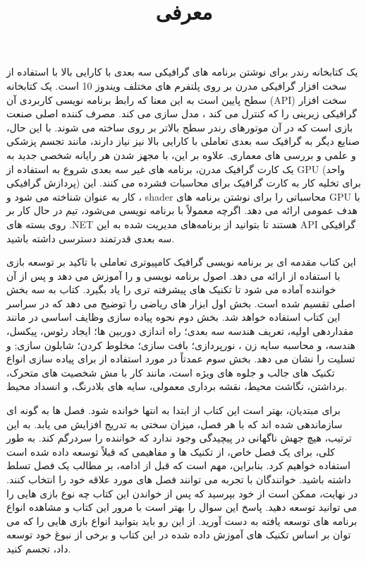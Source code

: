 \title{
    \center \Huge
    معرفی \\[25pt]
}

{
        {  \large
     یک کتابخانه رندر برای نوشتن برنامه های گرافیکی سه بعدی با کارایی بالا با استفاده از سخت افزار گرافیکی مدرن بر روی پلتفرم های مختلف ویندوز 10  است.
     یک کتابخانه سطح پایین است به این معنا که رابط برنامه نویسی کاربردی آن (API) سخت افزار گرافیکی زیرینی را که کنترل می کند ، مدل سازی می کند.
    مصرف کننده اصلی  صنعت بازی است که در آن موتورهای رندر سطح بالاتر بر روی  ساخته می شوند.
    با این حال، صنایع دیگر به گرافیک سه بعدی تعاملی با کارایی بالا نیز نیاز دارند، مانند تجسم پزشکی و علمی و بررسی های معماری.
    علاوه بر این، با مجهز شدن هر رایانه شخصی جدید به یک کارت گرافیک مدرن، برنامه های غیر سه بعدی شروع به استفاده از GPU (واحد پردازش گرافیکی) برای تخلیه کار به کارت گرافیک برای محاسبات فشرده می کنند.
    این کار به عنوان  شناخته می شود و  ، shader محاسباتی را برای نوشتن برنامه های GPU با هدف عمومی ارائه می دهد.
    اگرچه  معمولاً با   برنامه نویسی می‌شود، تیم   در حال کار بر روی بسته های .NET هستند تا بتوانید از برنامه‌های مدیریت شده به این API گرافیکی سه بعدی قدرتمند دسترسی داشته باشید.
    }

        {  \large
    این کتاب مقدمه ای بر برنامه نویسی گرافیک کامپیوتری تعاملی با تاکید بر توسعه بازی با استفاده از  ارائه می دهد. اصول برنامه نویسی  و  را آموزش می دهد و پس از آن خواننده آماده می شود تا تکنیک های پیشرفته تری را یاد بگیرد.
    کتاب به سه بخش اصلی تقسیم شده است. بخش اول ابزار های ریاضی را توضیح می دهد که در سراسر این کتاب استفاده خواهد شد.
    بخش دوم نحوه پیاده سازی وظایف اساسی در  مانند مقداردهی اولیه، تعریف هندسه سه بعدی؛ راه اندازی دوربین ها؛ ایجاد رئوس، پیکسل، هندسه، و محاسبه سایه زن ، نورپردازی؛ بافت سازی؛ مخلوط کردن؛ شابلون سازی; و تسلیت را نشان می دهد.
    بخش سوم عمدتاً در مورد استفاده از  برای پیاده سازی انواع تکنیک های جالب و جلوه های ویژه است، مانند کار با مش شخصیت های متحرک، برداشتن، نگاشت محیط، نقشه برداری معمولی، سایه های بلادرنگ، و انسداد محیط.
    }

        {  \large
    برای مبتدیان، بهتر است این کتاب از ابتدا به انتها خوانده شود. فصل ها به گونه ای سازماندهی شده اند که با هر فصل، میزان سختی به تدریج افزایش می یابد. به این ترتیب، هیچ جهش ناگهانی در پیچیدگی وجود ندارد که خواننده را سردرگم کند.
    به طور کلی، برای یک فصل خاص، از تکنیک ها و مفاهیمی که قبلاً توسعه داده شده است استفاده خواهیم کرد. بنابراین، مهم است که قبل از ادامه، بر مطالب یک فصل تسلط داشته باشید.
    خوانندگان با تجربه می توانند فصل های مورد علاقه خود را انتخاب کنند. در نهایت، ممکن است از خود بپرسید که پس از خواندن این کتاب چه نوع بازی هایی را می توانید توسعه دهید. پاسخ این سوال را بهتر است با مرور این کتاب و مشاهده انواع برنامه های توسعه یافته به دست آورید. از این رو باید بتوانید انواع بازی هایی را که می توان بر اساس تکنیک های آموزش داده شده در این کتاب و برخی از نبوغ خود توسعه داد، تجسم کنید.
    }
}
\newpage

